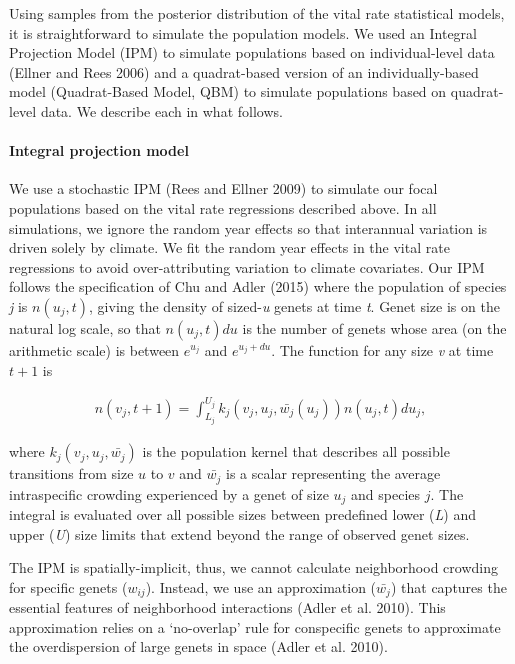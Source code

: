 \documentclass[12pt,]{article}
\begin{document}
Using samples from the posterior distribution of the vital rate
statistical models, it is straightforward to simulate the population
models. We used an Integral Projection Model (IPM) to simulate
populations based on individual-level data (Ellner and Rees 2006) and a
quadrat-based version of an individually-based model (Quadrat-Based
Model, QBM) to simulate populations based on quadrat-level data. We
describe each in what follows.

\paragraph{Integral projection model}\label{integral-projection-model}

We use a stochastic IPM (Rees and Ellner 2009) to simulate our focal
populations based on the vital rate regressions described above. In all
simulations, we ignore the random year effects so that interannual
variation is driven solely by climate. We fit the random year effects in
the vital rate regressions to avoid over-attributing variation to
climate covariates. Our IPM follows the specification of Chu and Adler
(2015) where the population of species \emph{j} is \(n(u_{j},t)\),
giving the density of sized-\emph{u} genets at time \emph{t}. Genet size
is on the natural log scale, so that \(n(u_{j},t)du\) is the number of
genets whose area (on the arithmetic scale) is between \(e^{u_{j}}\) and
\(e^{u_{j}+du}\). The function for any size \emph{v} at time \(t+1\) is

\vspace{-3em}\begin{align}
n(v_{j},t+1) = \int_{L_{j}}^{U_{j}} k_{j}(v_{j},u_{j},\bar{w_{j}}(u_{j}))n(u_{j},t)du_{j},
\end{align}\vspace{-3em}

where \(k_{j}(v_{j},u_{j},\bar{w_{j}})\) is the population kernel that
describes all possible transitions from size \(u\) to \(v\) and
\(\bar{w_{j}}\) is a scalar representing the average intraspecific
crowding experienced by a genet of size \(u_j\) and species \(j\). The
integral is evaluated over all possible sizes between predefined lower
(\emph{L}) and upper (\emph{U}) size limits that extend beyond the range
of observed genet sizes.

The IPM is spatially-implicit, thus, we cannot calculate neighborhood
crowding for specific genets (\(w_{ij}\)). Instead, we use an
approximation (\(\bar{w_{j}}\)) that captures the essential features of
neighborhood interactions (Adler et al. 2010). This approximation relies
on a `no-overlap' rule for conspecific genets to approximate the
overdispersion of large genets in space (Adler et al. 2010).
\end{document}
